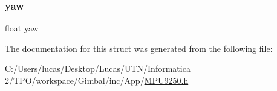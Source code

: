 \subsubsection{\texorpdfstring{yaw}{yaw}}
{\footnotesize\ttfamily float yaw}



The documentation for this struct was generated from the following file\+:\begin{DoxyCompactItemize}
\item 
C\+:/\+Users/lucas/\+Desktop/\+Lucas/\+U\+T\+N/\+Informatica 2/\+T\+P\+O/workspace/\+Gimbal/inc/\+App/\mbox{\hyperlink{_m_p_u9250_8h}{M\+P\+U9250.\+h}}\end{DoxyCompactItemize}
